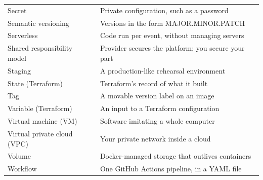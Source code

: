 \begin{booktable}
\begin{longtable}{>{\raggedright\arraybackslash}p{}>{\raggedright\arraybackslash}p{}}
Secret & Private configuration, such as a password \\
Semantic versioning & Versions in the form MAJOR.MINOR.PATCH \\
Serverless & Code run per event, without managing servers \\
Shared responsibility model & Provider secures the platform; you secure your part \\
Staging & A production-like rehearsal environment \\
State (Terraform) & Terraform's record of what it built \\
Tag & A movable version label on an image \\
Variable (Terraform) & An input to a Terraform configuration \\
Virtual machine (VM) & Software imitating a whole computer \\
Virtual private cloud (VPC) & Your private network inside a cloud \\
Volume & Docker-managed storage that outlives containers \\
Workflow & One GitHub Actions pipeline, in a YAML file \\
\end{longtable}
\end{booktable}

